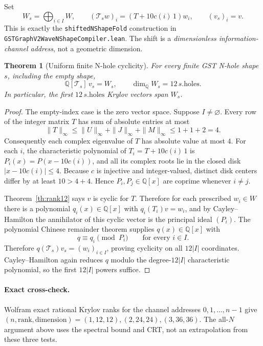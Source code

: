 \documentclass[11pt]{article}
\newtheorem{theorem}{Theorem}
\newcommand{\QQ}{\mathbb Q}
\begin{document}
Set
\[
 W_s=\bigoplus_{i\in I}W,\qquad
 (\mathcal T_s w)_i=(T+10c(i)\,1)w_i,\qquad
 (v_s)_i=v.
\]
This is exactly the \texttt{shiftedNShapeFold} construction in
\texttt{GSTGraphV2WaveNShapeCompiler.lean}. The shift is a \emph{dimensionless information-channel address}, not a geometric dimension.

\begin{theorem}[Uniform finite N-hole cyclicity]\label{th:N}
For \emph{every} finite GST N-hole shape \(s\), including the empty shape,
\[
\boxed{\QQ[\mathcal T_s]\,v_s=W_s,\qquad \dim_\QQ W_s=12\,s.\mathrm{holes}.}
\]
In particular, the first \(12\,s.\mathrm{holes}\) Krylov vectors span \(W_s\).
\end{theorem}
\begin{proof}
The empty-index case is the zero vector space. Suppose \(I\ne\varnothing\).
Every row of the integer matrix \(T\) has sum of absolute entries at most
\[
 \|T\|_\infty\le\|U\|_\infty+\|J\|_\infty+\|M\|_\infty
 \le1+1+2=4.
\]
Consequently each complex eigenvalue of \(T\) has absolute value at most \(4\). For each \(i\), the characteristic polynomial of \(T_i=T+10c(i)\,1\) is
\(P_i(x)=P(x-10c(i))\), and all its complex roots lie in the closed disk
\(\lvert x-10c(i)\rvert\le4\).
Because \(c\) is injective and integer-valued, distinct disk centers differ by at least \(10>4+4\). Hence \(P_i,P_j\in\QQ[x]\) are coprime whenever \(i\ne j\).

Theorem~\ref{th:rank12} says \(v\) is cyclic for \(T\). Therefore for each prescribed
\(w_i\in W\) there is a polynomial \(q_i(x)\in\QQ[x]\) with
\(q_i(T_i)v=w_i\), and by Cayley--Hamilton the annihilator of this cyclic vector is the principal ideal \((P_i)\).
The polynomial Chinese remainder theorem supplies \(q(x)\in\QQ[x]\) with
\[
 q\equiv q_i\pmod{P_i}\qquad\text{for every }i\in I.
\]
Therefore \(q(\mathcal T_s)v_s=(w_i)_{i\in I}\), proving cyclicity on all \(12|I|\) coordinates. Cayley--Hamilton again reduces \(q\) modulo the degree-\(12|I|\) characteristic polynomial, so the first \(12|I|\) powers suffice.
\end{proof}

\paragraph{Exact cross-check.}
Wolfram exact rational Krylov ranks for the channel addresses \(0,1,\ldots,n-1\) give
\((n,\mathrm{rank},\mathrm{dimension})=(1,12,12),(2,24,24),(3,36,36)\).
The all-\(N\) argument above uses the spectral bound and CRT, not an extrapolation from these three tests.
\end{document}
